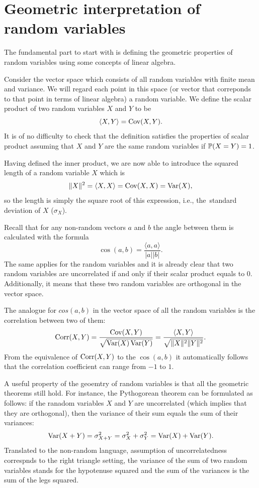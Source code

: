 \section{Geometric interpretation of random variables}

The fundamental part to start with is defining the geometric properties of random
variables using some concepts of linear algebra.

Consider the vector space which consists of all random variables with finite
mean and variance.
We will regard each point in this space (or vector that correponds to that point
in terms of linear algebra) a random variable.
We define the scalar product of two random variables $X$ and $Y$ to be
\[
\langle X, Y \rangle = \Cov(X,Y).
\]
It is of no difficulty to check that the definition satisfies the properties
of scalar product assuming that $X$ and $Y$ are the same random variables
if $\P(X=Y)=1$.

Having defined the inner product, we are now able to introduce the squared
length of a random variable $X$ which is
\[
\lVert X \rVert^2 = \langle X, X \rangle = \Cov(X,X) = \Var(X),
\]
so the length is simply the square root of this expression, i.e., the~standard
deviation of $X$ ($\sigma_X$).

Recall that for any non-random vectors $a$ and $b$ the angle
between them is calculated with the formula
\[
\cos(a, b) = \frac{\langle a,  a\rangle}{|a| |b|}.
\]
The same applies for the random variables and it is already clear that
two random variables are uncorrelated if and only if their scalar product
equals to $0$. Additionally, it means that these two random variables
are orthogonal in the vector space.

The analogue for $cos(a, b)$ in the vector space of all the random
variables is the correlation between two of them:
\[
\Corr(X,Y) = \frac{\Cov(X,Y)}{\sqrt{\Var(X)\Var(Y)}} = \frac{\langle X, Y \rangle}{\sqrt{\lVert X \rVert^2 \lVert Y \rVert^2}}.
\]
From the equivalence of $\Corr(X,Y)$ to the $\cos(a, b)$ it
automatically follows that the correlation coefficient can range from $-1$ to $1$.

A useful property of the geoemtry of random variables is that all the
geometric theorems still hold. For instance, the Pythogorean theorem can
be formulated as follows: if the ranadom variables $X$ and $Y$ are uncorrelated
(which implies that they are orthogonal), then the variance of their sum equals
the sum of their variances:
\[
\Var(X + Y) = \sigma^2_{X+Y} = \sigma^2_{X} + \sigma^2_{Y} = \Var(X) + \Var(Y).
\]
Translated to the non-random language, assumption of uncorrelatedness correspnds
to the right triangle setting, the variance of the sum of two random variables
stands for the hypotenuse squared and the sum of the variances is the sum of
the legs squared.

